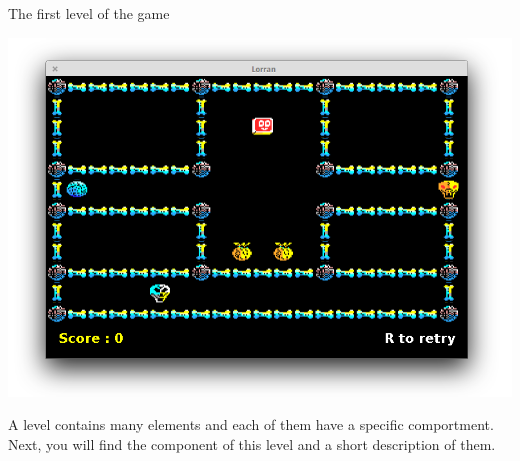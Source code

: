 \documentclass{report}
\begin{document}
\begin{center}
\textsf{The first level of the game}\par
\includegraphics[scale=0.5]{resources/lvlorann.png}
\end{center}

A level contains many elements and each of them have a specific comportment. Next, you will find the component of this level and a short description of them.
\end{document}
